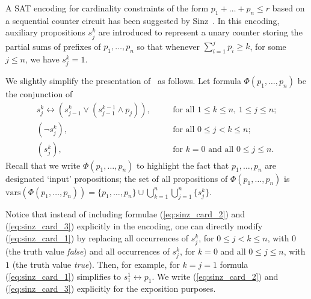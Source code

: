 \documentclass{article} \usepackage[utf8]{inputenc}
\newcommand*{\csf}{\ensuremath{{s}}}
\newcommand*{\Sinz}{\ensuremath{\Phi}}
\newcommand*{\vars}{\ensuremath{\mathrm{vars}}}
\begin{document}
A SAT encoding for cardinality constraints of the
form $p_1+\dots + p_n\leq r$ based on a sequential counter circuit has been
suggested by Sinz~. In this encoding, auxiliary propositions
$\csf^k_j$ are introduced to represent a unary counter storing the partial sums
of prefixes of $p_1,\dots, p_n$ so that whenever $\sum_{i=1}^j p_i\geq k$, for
some $j\leq n$, we have $\csf^k_j=1$.  


We slightly simplify the presentation of~\cite{Sinz05} as follows.
Let formula $\Sinz(p_1,\dots,p_n)$
be the conjunction of \begin{eqnarray}
\label{eq:sinz_card_1}\csf^k_j \leftrightarrow (\csf^k_{j-1}\lor (\csf^{k-1}_{j-1}\land p_j)), &\quad & \textrm{for all $1\leq k\leq n$, $1\leq j\leq n$};\\
\label{eq:sinz_card_2}(\lnot \csf^k_j), & &\textrm{for all $0\leq j<k \leq n$};\\
\label{eq:sinz_card_3}(\csf^k_j), & &\textrm{for $k=0$ and all $0\leq j \leq n$}.
\end{eqnarray}
Recall that we write $\Sinz(p_1,\dots,p_n)$ to highlight the fact that 
$p_1,\dots, p_n$ are designated `input' propositions; the set of 
all propositions 
of $\Sinz(p_1,\dots,p_n)$ is
$\vars(\Sinz(p_1,\dots,p_n)) = \{p_1,\dots,p_n\}\cup\bigcup_{k=1}^n\bigcup_{j=1}^n\{\csf^k_j\}$.

Notice that instead of including formulae (\ref{eq:sinz_card_2}) and
(\ref{eq:sinz_card_3}) explicitly in the encoding, one can directly
modify (\ref{eq:sinz_card_1}) by replacing  
all occurrences of $\csf^k_j$, for $0\leq j<k \leq n$, with $0$ (the truth
value \emph{false}) and all occurrences of $\csf^k_j$, for $k=0$ and all 
$0\leq j \leq n$, with $1$ (the truth value \emph{true}).
Then, for example, for $k=j=1$ formula (\ref{eq:sinz_card_1}) simplifies to
$\csf^1_1\leftrightarrow p_1$. We write (\ref{eq:sinz_card_2}) and
(\ref{eq:sinz_card_3})  explicitly for the exposition purposes.
\end{document}
